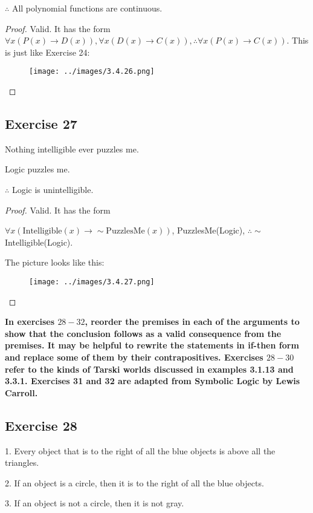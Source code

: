\documentclass[14pt]{extarticle}
\newcommand{\fa}{\forall}
\begin{document}
$\therefore$ All polynomial functions are continuous.

\begin{proof}
    Valid. It has the form $\fa x (P(x) \to D(x)), \fa x (D(x) \to C(x)), \therefore \fa x (P(x) \to C(x))$. This is just like Exercise 24:

    \begin{figure}[ht!]
        \centering
        \texttt{[image: ../images/3.4.26.png]}
    \end{figure}
\end{proof}

\subsection{Exercise 27}
Nothing intelligible ever puzzles me.

Logic puzzles me.

$\therefore$ Logic is unintelligible.

\begin{proof}
    Valid. It has the form

    $\fa x (\text{Intelligible}(x) \to \sim \text{PuzzlesMe}(x))$, PuzzlesMe(Logic), $\therefore \sim$Intelligible(Logic).

    The picture looks like this:

    \begin{figure}[ht!]
        \centering
        \texttt{[image: ../images/3.4.27.png]}
    \end{figure}
\end{proof}

{\bf \color{cyan} In exercises $28-32$, reorder the premises in each of the arguments to show that the conclusion follows as a valid consequence from the premises. It may be helpful to rewrite the statements in if-then form and replace some of them by their contrapositives. Exercises $28-30$ refer to the kinds of Tarski worlds discussed in examples 3.1.13 and 3.3.1. Exercises 31 and 32 are adapted from Symbolic Logic by Lewis Carroll.}

\subsection{Exercise 28}
1. Every object that is to the right of all the blue objects is above all the triangles.

2. If an object is a circle, then it is to the right of all the blue objects.

3. If an object is not a circle, then it is not gray.
\end{document}

